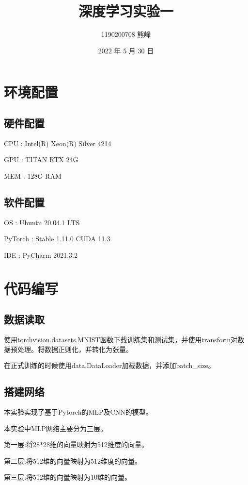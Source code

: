 \documentclass[UTF8]{ctexart}
\title{深度学习实验一}
\author{1190200708 熊峰}
\date{2022 年 5 月 30 日}
\begin{document}
 
\maketitle 

\newpage
\tableofcontents
\newpage

\section{环境配置}
\subsection{硬件配置}
CPU : Intel(R) Xeon(R) Silver 4214 \par
GPU : TITAN RTX 24G \par
MEM : 128G RAM  \par
\subsection{软件配置}
OS : Ubuntu 20.04.1 LTS \par
PyTorch : Stable 1.11.0  CUDA 11.3 \par
IDE : PyCharm 2021.3.2 \par


\section{代码编写}

\subsection{数据读取}
使用torchvision.datasets.MNIST函数下载训练集和测试集，并使用transform对数据预处理。将数据正则化，并转化为张量。\par
在正式训练的时候使用data.DataLoader加载数据，并添加batch\_size。\par 
\subsection{搭建网络}
本实验实现了基于Pytorch的MLP及CNN的模型。\par
本实验中MLP网络主要分为三层。\par
第一层:将28*28维的向量映射为512维度的向量。\par
第二层:将512维的向量映射为512维度的向量。\par
第三层:将512维的向量映射为10维的向量。 \par
\end{document}
